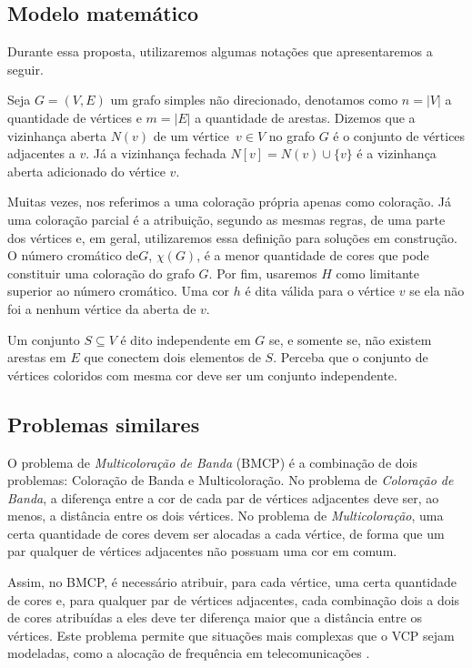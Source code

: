 \documentclass[11pt]{article}
\providecommand{\DIFaddtex}[1]{{\protect\color{blue}{#1}}} %
\providecommand{\DIFaddbegin}{} %
\providecommand{\DIFaddend}{} %
\providecommand{\DIFadd}[1]{\texorpdfstring{\DIFaddtex{#1}}{#1}} %
\newcommand{\DIFaddincludegraphics}[2][]{{\color{blue}\fbox{\DIFOincludegraphics[#1]{#2}}}} %
\DeclareRobustCommand{\DIFaddbegin}{\DIFOaddbegin \let\includegraphics\DIFaddincludegraphics} %
\DeclareRobustCommand{\DIFaddend}{\DIFOaddend \let\includegraphics\DIFOincludegraphics} %
\begin{document}
\subsection{Modelo matemático}
 \DIFaddbegin \label{sec:org85c73d0}
\DIFaddend Durante essa proposta, utilizaremos algumas notações que apresentaremos a seguir.

Seja \(G = (V,E)\) um grafo simples não direcionado, denotamos como \(n = |V|\) a quantidade de vértices e \(m = |E|\) a quantidade de arestas.
Dizemos que a vizinhança aberta \(N(v)\) de um vértice~\(v \in V\) no grafo \(G\) é o conjunto de vértices adjacentes a \(v\).
Já a vizinhança fechada \(N[v] = N(v) \cup \{v\}\) é a vizinhança aberta adicionado do vértice \(v\).

Muitas vezes, nos referimos a uma coloração própria apenas como coloração.
Já uma coloração parcial é a atribuição, segundo as mesmas regras, de uma parte dos vértices e, em geral, utilizaremos essa definição para soluções em construção.
O número cromático de\DIFaddbegin \DIFadd{~}\DIFaddend \(G\), \DIFaddbegin \DIFadd{denotado por }\DIFaddend \(\chi(G)\), é a menor quantidade de cores que pode constituir uma coloração do grafo \(G\).
Por fim, usaremos \(H\) como limitante superior ao número cromático.
Uma cor \(h\) é dita válida para o vértice \(v\) se ela não foi  \DIFaddbegin \DIFadd{atribuída }\DIFaddend a nenhum vértice da  \DIFaddbegin \DIFadd{vizinhança }\DIFaddend aberta de \(v\).

Um conjunto \(S \subseteq V\) é dito independente em \(G\) se, e somente se, não existem arestas em \(E\) que conectem dois elementos de \(S\).
Perceba que o conjunto de vértices coloridos com mesma cor deve ser um conjunto independente.

\subsection{Problemas similares}
 \DIFaddbegin \label{sec:org8a2e7af}
\DIFaddend O problema de \emph{Multicoloração de Banda} (BMCP) é a combinação de dois problemas: Coloração de Banda e Multicoloração.
No problema de \emph{Coloração de Banda}, a diferença entre a cor de cada par de vértices adjacentes deve ser, ao menos, a distância entre os dois vértices.
No problema de \emph{Multicoloração}, uma certa quantidade de cores devem ser alocadas a cada vértice, de forma que um par qualquer de vértices adjacentes não possuam uma cor em comum.

Assim, no BMCP, é necessário atribuir, para cada vértice, uma certa quantidade de cores e, para qualquer par de vértices adjacentes, cada combinação dois a dois de cores atribuídas a eles deve ter diferença maior que a distância entre os vértices.
Este problema permite que situações mais complexas que o VCP sejam modeladas, como a alocação de frequência em telecomunicações \autocite{Aardal2007Modelssolutiontechniques}.
\end{document}
